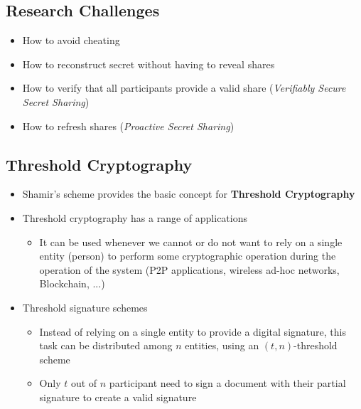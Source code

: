 \subsection{Research Challenges}
\begin{itemize}
	\item How to avoid cheating
	\item How to reconstruct secret without having to reveal shares
	\item How to verify that all participants provide a valid share (\textit{Verifiably Secure Secret Sharing})
	\item How to refresh shares (\textit{Proactive Secret Sharing})
\end{itemize}

\subsection{Threshold Cryptography}
\begin{itemize}
	\item Shamir's scheme provides the basic concept for \textbf{Threshold Cryptography}
	\item Threshold cryptography has a range of applications
	\begin{itemize}
		\item It can be used whenever we cannot or do not want to rely on a single entity (person) to perform some cryptographic operation during the operation of the system (P2P applications, wireless ad-hoc networks, Blockchain, ...)
	\end{itemize}
	\item Threshold signature schemes
	\begin{itemize}
		\item Instead of relying on a single entity to provide a digital signature, this task can be distributed among $n$ entities, using an $(t,n)$-threshold scheme
		\item Only $t$ out of $n$ participant need to sign a document with their partial signature to create a valid signature
	\end{itemize}
\end{itemize}